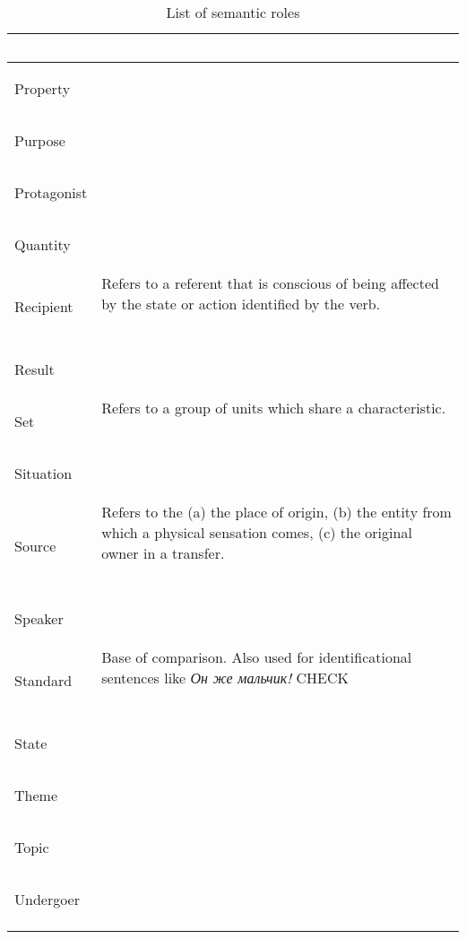 \documentclass[a4paper,11pt, onecolumn,twoside]{article}
\begin{document}
\begin{longtable}{ p{}  p{} }
        & ~ \\
\midrule
 \multirow{2}{*}{Property} & ~ \\ 
        & ~ \\
\midrule
 \multirow{2}{*}{Purpose} & ~ \\ 
        & ~ \\
\midrule
 \multirow{2}{*}{Protagonist} & ~ \\ %
        & ~ \\
\midrule
 \multirow{2}{*}{Quantity} & ~ \\  %
        & ~ \\
\midrule
 \multirow{2}{*}{Recipient} & Refers to a referent that is conscious of being affected by the state or action identified by the verb. \\ 
        & ~ \\
\midrule
 \multirow{2}{*}{Result} & ~ \\ 
        & ~ \\
\midrule
 \multirow{2}{*}{Set} &  Refers to a group of units which share a characteristic. \\
        & ~ \\
\midrule
 \multirow{2}{*}{Situation} & ~ \\ 
        & ~ \\
\midrule
 \multirow{2}{*}{Source} & Refers to the (a) the place of origin, (b) the entity from which a physical sensation comes, (c) the original owner in a transfer. \\ 
        & ~ \\
\midrule
 \multirow{2}{*}{Speaker} & ~ \\ 
        & ~ \\
\midrule
 \multirow{2}{*}{Standard} & Base of comparison. Also used for identificational sentences like \emph{Он же мальчик!} CHECK \\ %
        & ~ \\
\midrule
 \multirow{2}{*}{State} & ~ \\ 
        & ~ \\
\midrule
 \multirow{2}{*}{Theme} & ~ \\ 
        & ~ \\
\midrule
 \multirow{2}{*}{Topic} & ~ \\  %
        & ~ \\
\midrule
 \multirow{2}{*}{Undergoer} & ~ \\ %
        & ~ \\
\bottomrule
\caption{List of semantic roles}
\label{table:semroles}
\end{longtable}
\end{document}
